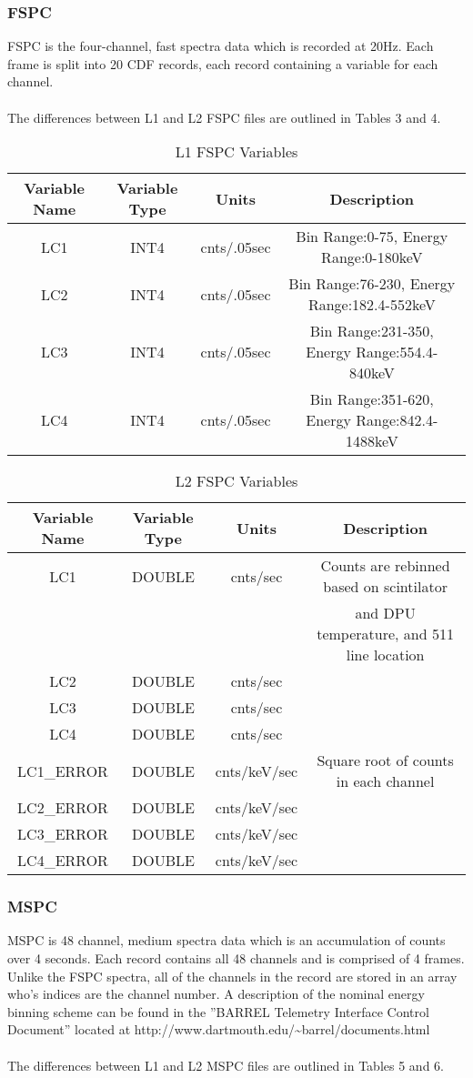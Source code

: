 \documentclass{article}
\begin{document}
\subsubsection{FSPC}
FSPC is the four-channel, fast spectra data which is recorded at 20Hz. Each frame is split into 20 CDF records, each record containing a variable for each channel.\\\\
The differences between L1 and L2 FSPC files are outlined in Tables 3 and 4.

\begin{table}[H]
\caption{L1 FSPC Variables}
\begin{tabular}{|c|c|c|c|}
\hline
Variable Name&Variable Type & Units & Description\\ \hline
LC1&INT4&cnts/.05sec&Bin Range:0-75, Energy Range:0-180keV\\
LC2&INT4&cnts/.05sec&Bin Range:76-230, Energy Range:182.4-552keV\\
LC3&INT4&cnts/.05sec&Bin Range:231-350, Energy Range:554.4-840keV\\
LC4&INT4&cnts/.05sec&Bin Range:351-620, Energy Range:842.4-1488keV\\
\hline
\end{tabular}
\end{table}

\begin{table}[H]
\caption{L2 FSPC Variables}
\begin{tabular}{|c|c|c|c|}
\hline
Variable Name&Variable Type&Units&Description\\ \hline
LC1&DOUBLE&cnts/sec&Counts are rebinned based on scintilator\\
~&~&~&and DPU temperature, and 511 line location \\
LC2&DOUBLE&cnts/sec &  ~\\ 
LC3&DOUBLE&cnts/sec & ~\\ 
LC4&DOUBLE&cnts/sec & ~\\
LC1\_ERROR&DOUBLE&cnts/keV/sec&Square root of counts in each channel\\ 
LC2\_ERROR&DOUBLE&cnts/keV/sec&~\\ 
LC3\_ERROR&DOUBLE&cnts/keV/sec&~\\ 
LC4\_ERROR&DOUBLE&cnts/keV/sec&~\\
\hline
\end{tabular}
\end{table}

\subsubsection{MSPC}
MSPC is 48 channel, medium spectra data which is an accumulation of counts over 4 seconds. Each record contains all 48 channels and is comprised of 4 frames. Unlike the FSPC spectra, all of the channels in the record are stored in an array who's indices are the channel number. A description of the nominal energy binning scheme can be found  in the ''BARREL Telemetry Interface Control Document'' located at http://www.dartmouth.edu/\~{}barrel/documents.html\\\\
The differences between L1 and L2 MSPC files are outlined in Tables 5 and 6.
\end{document}
